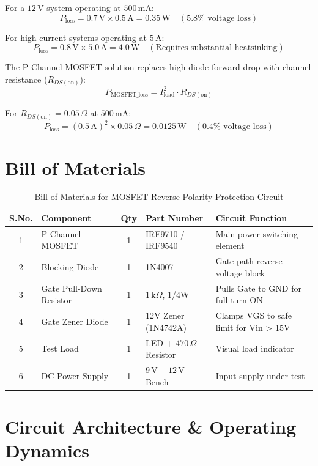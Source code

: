 \documentclass[11pt,a4paper]{article}
\begin{document}
For a $12\,\text{V}$ system operating at $500\,\text{mA}$:
\[
P_{\text{loss}} = 0.7\,\text{V} \times 0.5\,\text{A} = 0.35\,\text{W} \quad (5.8\% \text{ voltage loss})
\]

For high-current systems operating at $5\,\text{A}$:
\[
P_{\text{loss}} = 0.8\,\text{V} \times 5.0\,\text{A} = 4.0\,\text{W} \quad (\text{Requires substantial heatsinking})
\]

The P-Channel MOSFET solution replaces high diode forward drop with channel resistance ($R_{DS(\text{on})}$):
\begin{equation}
P_{\text{MOSFET\_loss}} = I_{\text{load}}^2 \cdot R_{DS(\text{on})}
\end{equation}

For $R_{DS(\text{on})} = 0.05\,\Omega$ at $500\,\text{mA}$:
\[
P_{\text{loss}} = (0.5\,\text{A})^2 \times 0.05\,\Omega = 0.0125\,\text{W} \quad (0.4\% \text{ voltage loss})
\]

\section{Bill of Materials}
\begin{table}[h!]
\centering
\caption{Bill of Materials for MOSFET Reverse Polarity Protection Circuit}
\vspace{0.5em}
\begin{tabular}{@{}c l c l p{6cm}@{}}
\toprule
\textbf{S.No.} & \textbf{Component} & \textbf{Qty} & \textbf{Part Number} & \textbf{Circuit Function} \\
\midrule
1 & P-Channel MOSFET & 1 & IRF9710 / IRF9540 & Main power switching element \\
2 & Blocking Diode & 1 & 1N4007 & Gate path reverse voltage block \\
3 & Gate Pull-Down Resistor & 1 & $1\,\text{k}\Omega$, 1/4W & Pulls Gate to GND for full turn-ON \\
4 & Gate Zener Diode & 1 & 12V Zener (1N4742A) & Clamps VGS to safe limit for Vin > 15V \\
5 & Test Load & 1 & LED + $470\,\Omega$ Resistor & Visual load indicator \\
6 & DC Power Supply & 1 & $9\,\text{V} - 12\,\text{V}$ Bench & Input supply under test \\
\bottomrule
\end{tabular}
\end{table}

\section{Circuit Architecture \& Operating Dynamics}
\end{document}
